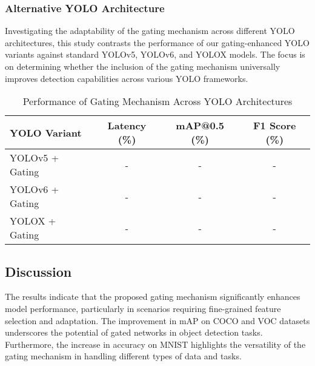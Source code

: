 \subsubsection{Alternative YOLO Architecture}

Investigating the adaptability of the gating mechanism across different YOLO architectures, this study contrasts the performance of our gating-enhanced YOLO variants against standard YOLOv5, YOLOv6, and YOLOX models. The focus is on determining whether the inclusion of the gating mechanism universally improves detection capabilities across various YOLO frameworks.

\begin{table}[ht]
\centering
\caption{Performance of Gating Mechanism Across YOLO Architectures}
\label{tab:yolo_architecture}
\begin{tabular}{@{}lccc@{}}
\toprule
YOLO Variant & Latency (\%) & mAP@0.5 (\%) & F1 Score (\%) \\ 
\midrule
YOLOv5 + Gating & - & - & - \\
YOLOv6 + Gating & - & - & - \\
YOLOX + Gating & - & - & - \\
\bottomrule
\end{tabular}
\end{table}

\subsection{Discussion}

The results indicate that the proposed gating mechanism significantly enhances model performance, particularly in scenarios requiring fine-grained feature selection and adaptation. The improvement in mAP on COCO and VOC datasets underscores the potential of gated networks in object detection tasks. Furthermore, the increase in accuracy on MNIST highlights the versatility of the gating mechanism in handling different types of data and tasks.

\clearpage
